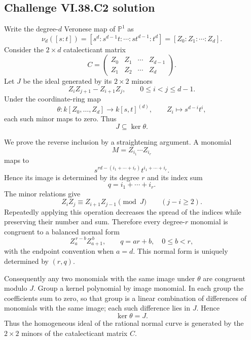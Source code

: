\subsection*{Challenge VI.38.C2 solution}
\begin{solution}
Write the degree-\(d\) Veronese map of \(\mathbb P^1\) as
\[
\nu_d([s:t])
=[s^d:s^{d-1}t:\cdots:st^{d-1}:t^d]
=[Z_0:Z_1:\cdots:Z_d].
\]
Consider the \(2\times d\) catalecticant matrix
\[
C=
\begin{pmatrix}
Z_0&Z_1&\cdots&Z_{d-1}\\
Z_1&Z_2&\cdots&Z_d
\end{pmatrix}.
\]
Let \(J\) be the ideal generated by its \(2\times2\) minors
\[
Z_iZ_{j+1}-Z_{i+1}Z_j,
\qquad 0\le i<j\le d-1.
\]
Under the coordinate-ring map
\[
\theta:k[Z_0,\ldots,Z_d]\longrightarrow k[s,t]^{(d)},
\qquad
Z_i\longmapsto s^{d-i}t^i,
\]
each such minor maps to zero. Thus
\[
J\subseteq\ker\theta.
\]

We prove the reverse inclusion by a straightening argument.  A monomial
\[
M=Z_{i_1}\cdots Z_{i_r}
\]
maps to
\[
s^{rd-(i_1+\cdots+i_r)}t^{i_1+\cdots+i_r}.
\]
Hence its image is determined by its degree \(r\) and its index sum
\[
q=i_1+\cdots+i_r.
\]
The minor relations give
\[
Z_iZ_j\equiv Z_{i+1}Z_{j-1}\pmod J
\qquad(j-i\ge2).
\]
Repeatedly applying this operation decreases the spread of the indices while
preserving their number and sum. Therefore every degree-\(r\) monomial is congruent
to a balanced normal form
\[
Z_a^{\,r-b}Z_{a+1}^{\,b},
\qquad
q=ar+b,
\quad 0\le b<r,
\]
with the endpoint convention when \(a=d\).  This normal form is uniquely determined
by \((r,q)\).

Consequently any two monomials with the same image under \(\theta\) are congruent
modulo \(J\).  Group a kernel polynomial by image monomial.  In each group the
coefficients sum to zero, so that group is a linear combination of differences of
monomials with the same image; each such difference lies in \(J\). Hence
\[
\boxed{\ker\theta=J}.
\]
Thus the homogeneous ideal of the rational normal curve is generated by the
\(2\times2\) minors of the catalecticant matrix \(C\).
\end{solution}

